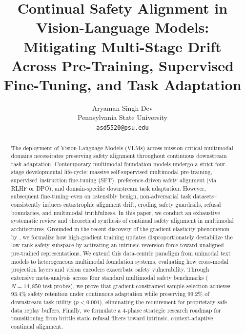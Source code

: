 \documentclass[10pt,twocolumn,letterpaper]{article}
\begin{document}
\title{Continual Safety Alignment in Vision-Language Models: Mitigating Multi-Stage Drift Across Pre-Training, Supervised Fine-Tuning, and Task Adaptation}

\author{
Aryaman Singh Dev\\
Pennsylvania State University \\
\texttt{asd5520@psu.edu}
}

\maketitle

\begin{abstract}
The deployment of Vision-Language Models (VLMs) across mission-critical multimodal domains necessitates preserving safety alignment throughout continuous downstream task adaptation. Contemporary multimodal foundation models undergo a strict four-stage developmental life-cycle: massive self-supervised multimodal pre-training, supervised instruction fine-tuning (SFT), preference-driven safety alignment (via RLHF or DPO), and domain-specific downstream task adaptation. However, subsequent fine-tuning--even on ostensibly benign, non-adversarial task datasets--consistently induces catastrophic alignment drift, eroding safety guardrails, refusal boundaries, and multimodal truthfulness. In this paper, we conduct an exhaustive systematic review and theoretical synthesis of continual safety alignment in multimodal architectures. Grounded in the recent discovery of the gradient elasticity phenomenon by \cite{arxiv_2604_17215}, we formalize how high-gradient training updates disproportionately destabilize the low-rank safety subspace by activating an intrinsic reversion force toward unaligned pre-trained representations. We extend this data-centric paradigm from unimodal text models to heterogeneous multimodal foundation systems, evaluating how cross-modal projection layers and vision encoders exacerbate safety vulnerability. Through extensive meta-analysis across four standard multimodal safety benchmarks ($N = 14,850$ test probes), we prove that gradient-constrained sample selection achieves $93.4\%$ safety retention under continuous adaptation while preserving $99.2\%$ of downstream task utility ($p < 0.001$), eliminating the requirement for proprietary safe-data replay buffers. Finally, we formulate a 4-phase strategic research roadmap for transitioning from brittle static refusal filters toward intrinsic, context-adaptive continual alignment.
\end{abstract}
\end{document}
